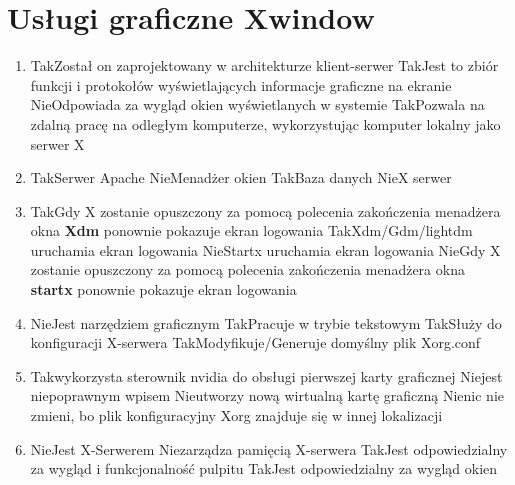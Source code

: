 \section{Usługi graficzne Xwindow}

\begin{enumerate}
	
	\item {}
	{Tak}{Został on zaprojektowany w architekturze klient-serwer}
	{Tak}{Jest to zbiór funkcji i protokołów wyświetlających informacje graficzne na ekranie}
	{Nie}{Odpowiada za wygląd okien wyświetlanych w systemie}
	{Tak}{Pozwala na zdalną pracę na odległym komputerze, wykorzystując komputer lokalny jako serwer X}

	\item {}
	{Tak}{Serwer Apache}
	{Nie}{Menadżer okien}
	{Tak}{Baza danych}
	{Nie}{X serwer}
	
	\item {}
	{Tak}{Gdy X zostanie opuszczony za pomocą polecenia zakończenia menadżera okna \textbf{Xdm} ponownie pokazuje ekran logowania}
	{Tak}{Xdm/Gdm/lightdm uruchamia ekran logowania}
	{Nie}{Startx uruchamia ekran logowania}
	{Nie}{Gdy X zostanie opuszczony za pomocą polecenia zakończenia menadżera okna \textbf{startx} ponownie pokazuje ekran logowania}
	
	\item {}
	{Nie}{Jest narzędziem graficznym}
	{Tak}{Pracuje w trybie tekstowym}
	{Tak}{Służy do konfiguracji X-serwera}
	{Tak}{Modyfikuje/Generuje domyślny plik Xorg.conf}

	\item {}
	{Tak}{wykorzysta sterownik nvidia do obsługi pierwszej karty graficznej}
	{Nie}{jest niepoprawnym wpisem}
	{Nie}{utworzy nową wirtualną kartę graficzną}
	{Nie}{nic nie zmieni, bo plik konfiguracyjny Xorg znajduje się w innej lokalizacji}
	
	\newpage
	
	\item {}
	{Nie}{Jest X-Serwerem}
	{Nie}{zarządza pamięcią X-serwera}
	{Tak}{Jest odpowiedzialny za wygląd i funkcjonalność pulpitu}
	{Tak}{Jest odpowiedzialny za wygląd okien}
	

\end{enumerate}
